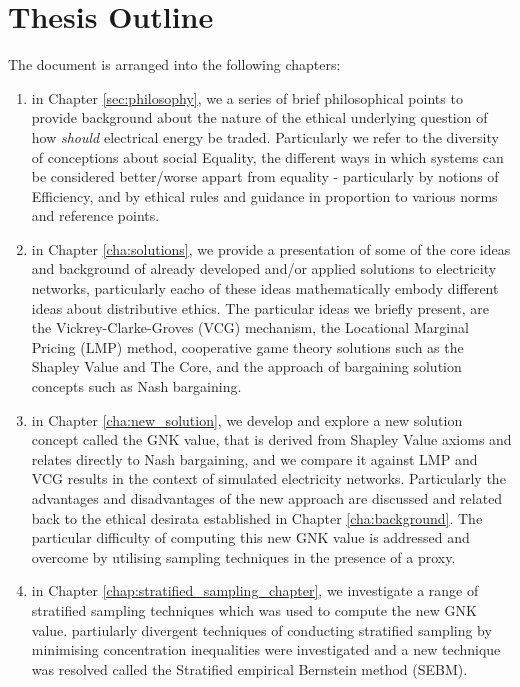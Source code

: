 \section{Thesis Outline}
The document is arranged into the following chapters:
\begin{enumerate}
\item in Chapter \ref{sec:philosophy}, we a series of brief philosophical points to provide background about the nature of the ethical underlying question of how \textit{should} electrical energy be traded. Particularly we refer to the diversity of conceptions about social Equality, the different ways in which systems can be considered better/worse appart from equality - particularly by notions of Efficiency, and by ethical rules and guidance in proportion to various norms and reference points. 
\item in Chapter \ref{cha:solutions}, we provide a presentation of some of the core ideas and background of already developed and/or applied solutions to electricity networks, particularly eacho of these ideas mathematically embody different ideas about distributive ethics. The particular ideas we briefly present, are the Vickrey-Clarke-Groves (VCG) mechanism, the Locational Marginal Pricing (LMP) method, cooperative game theory solutions such as the Shapley Value and The Core, and the approach of bargaining solution concepts such as Nash bargaining. 
\item in Chapter \ref{cha:new_solution}, we develop and explore a new solution concept called the GNK value, that is derived from Shapley Value axioms and relates directly to Nash bargaining, and we compare it against LMP and VCG results in the context of simulated electricity networks. Particularly the advantages and disadvantages of the new approach are discussed and related back to the ethical desirata established in Chapter \ref{cha:background}. The particular difficulty of computing this new GNK value is addressed and overcome by utilising sampling techniques in the presence of a proxy.
\item in Chapter \ref{chap:stratified_sampling_chapter}, we investigate a range of stratified sampling techniques which was used to compute the new GNK value. partiularly divergent techniques of conducting stratified sampling by minimising concentration inequalities were investigated and a new technique was resolved called the Stratified empirical Bernstein method (SEBM).
\end{enumerate}




